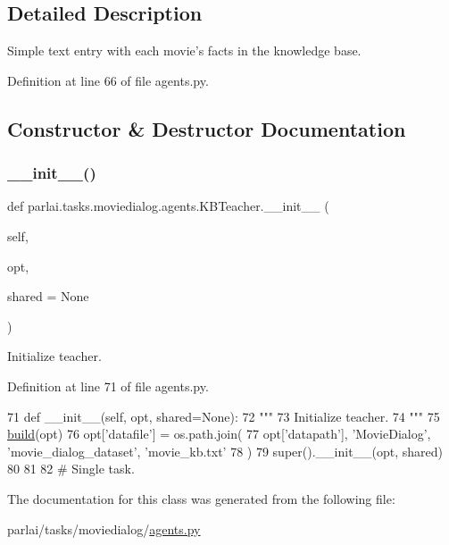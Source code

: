 \subsection{Detailed Description}
\begin{DoxyVerb}Simple text entry with each movie's facts in the knowledge base.
\end{DoxyVerb}
 

Definition at line 66 of file agents.\+py.



\subsection{Constructor \& Destructor Documentation}
\mbox{\label{classparlai_1_1tasks_1_1moviedialog_1_1agents_1_1KBTeacher_a3b8e113d7035a814bf991562b2e2b799}} 
\subsubsection{\texorpdfstring{\+\_\+\+\_\+init\+\_\+\+\_\+()}{\_\_init\_\_()}}
{\footnotesize\ttfamily def parlai.\+tasks.\+moviedialog.\+agents.\+K\+B\+Teacher.\+\_\+\+\_\+init\+\_\+\+\_\+ (\begin{DoxyParamCaption}\item[{}]{self,  }\item[{}]{opt,  }\item[{}]{shared = {\ttfamily None} }\end{DoxyParamCaption})}

\begin{DoxyVerb}Initialize teacher.
\end{DoxyVerb}
 

Definition at line 71 of file agents.\+py.


\begin{DoxyCode}
71     \textcolor{keyword}{def }\_\_init\_\_(self, opt, shared=None):
72         \textcolor{stringliteral}{"""}
73 \textcolor{stringliteral}{        Initialize teacher.}
74 \textcolor{stringliteral}{        """}
75         \hyperlink{namespaceparlai_1_1mturk_1_1tasks_1_1talkthewalk_1_1download_a8c0fbb9b6dfe127cb8c1bd6e7c4e33fd}{build}(opt)
76         opt[\textcolor{stringliteral}{'datafile'}] = os.path.join(
77             opt[\textcolor{stringliteral}{'datapath'}], \textcolor{stringliteral}{'MovieDialog'}, \textcolor{stringliteral}{'movie\_dialog\_dataset'}, \textcolor{stringliteral}{'movie\_kb.txt'}
78         )
79         super().\_\_init\_\_(opt, shared)
80 
81 
82 \textcolor{comment}{# Single task.}
\end{DoxyCode}


The documentation for this class was generated from the following file\+:\begin{DoxyCompactItemize}
\item 
parlai/tasks/moviedialog/\hyperlink{parlai_2tasks_2moviedialog_2agents_8py}{agents.\+py}\end{DoxyCompactItemize}
